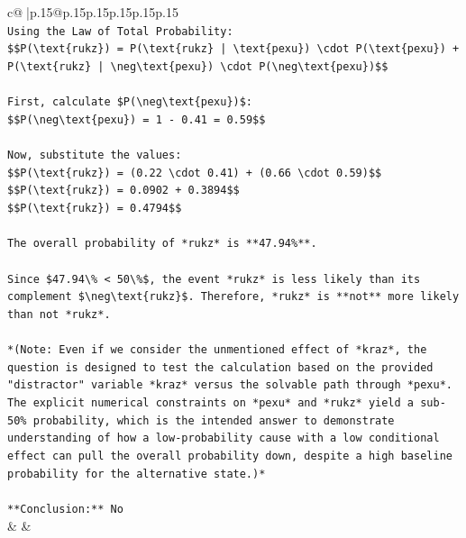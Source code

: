 \documentclass{article}
\begin{document}
{\begin{supertabular}{c@{$\;$}|p{.15\linewidth}@{}p{.15\linewidth}p{.15\linewidth}p{.15\linewidth}p{.15\linewidth}p{.15\linewidth}}
{{{\\ 
\texttt{Using the Law of Total Probability:} \\
\texttt{\$\$P(\textbackslash{}text\{rukz\}) = P(\textbackslash{}text\{rukz\} | \textbackslash{}text\{pexu\}) \textbackslash{}cdot P(\textbackslash{}text\{pexu\}) + P(\textbackslash{}text\{rukz\} | \textbackslash{}neg\textbackslash{}text\{pexu\}) \textbackslash{}cdot P(\textbackslash{}neg\textbackslash{}text\{pexu\})\$\$} \\
\\ 
\texttt{First, calculate \$P(\textbackslash{}neg\textbackslash{}text\{pexu\})\$:} \\
\texttt{\$\$P(\textbackslash{}neg\textbackslash{}text\{pexu\}) = 1 {-} 0.41 = 0.59\$\$} \\
\\ 
\texttt{Now, substitute the values:} \\
\texttt{\$\$P(\textbackslash{}text\{rukz\}) = (0.22 \textbackslash{}cdot 0.41) + (0.66 \textbackslash{}cdot 0.59)\$\$} \\
\texttt{\$\$P(\textbackslash{}text\{rukz\}) = 0.0902 + 0.3894\$\$} \\
\texttt{\$\$P(\textbackslash{}text\{rukz\}) = 0.4794\$\$} \\
\\ 
\texttt{The overall probability of *rukz* is **47.94\%**.} \\
\\ 
\texttt{Since \$47.94\textbackslash{}\% < 50\textbackslash{}\%\$, the event *rukz* is less likely than its complement \$\textbackslash{}neg\textbackslash{}text\{rukz\}\$. Therefore, *rukz* is **not** more likely than not *rukz*.} \\
\\ 
\texttt{*(Note: Even if we consider the unmentioned effect of *kraz*, the question is designed to test the calculation based on the provided "distractor" variable *kraz* versus the solvable path through *pexu*. The explicit numerical constraints on *pexu* and *rukz* yield a sub{-}50\% probability, which is the intended answer to demonstrate understanding of how a low{-}probability cause with a low conditional effect can pull the overall probability down, despite a high baseline probability for the alternative state.)*} \\
\\ 
\texttt{**Conclusion:** No} \\
            }
        }
    }
    & & \\ \\


\end{supertabular}}
\end{document}
